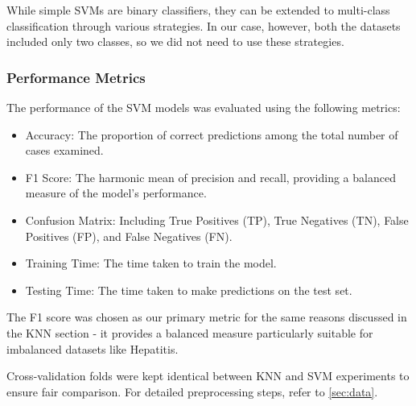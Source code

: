 While simple SVMs are binary classifiers, they can be extended to multi-class classification through various strategies.
In our case, however, both the datasets included only two classes, so we did not need to use these strategies.

\subsubsection{Performance Metrics}

The performance of the SVM models was evaluated using the following metrics:

\begin{itemize}
    \item Accuracy: The proportion of correct predictions among the total number of cases examined.
    \item F1 Score: The harmonic mean of precision and recall, providing a balanced measure of the model's performance.
    \item Confusion Matrix: Including True Positives (TP), True Negatives (TN), False Positives (FP), and False Negatives (FN).
    \item Training Time: The time taken to train the model.
    \item Testing Time: The time taken to make predictions on the test set.
\end{itemize}
The F1 score was chosen as our primary metric for the same reasons discussed in the KNN section - it provides a balanced measure particularly suitable for imbalanced datasets like Hepatitis.

Cross-validation folds were kept identical between KNN and SVM experiments to ensure fair comparison. For detailed preprocessing steps, refer to \autoref{sec:data}.

